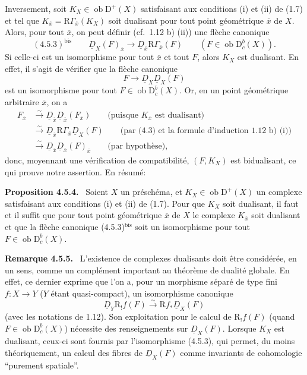 \documentclass[11pt]{article}
\newenvironment{statement}[1]{\par\medskip\noindent\textbf{#1.}\ }{\par\medskip}
\newcommand{\R}{\mathrm{R}}
\newcommand{\D}{\mathrm{D}}
\newcommand{\ob}{\operatorname{ob}}
\newcommand{\ol}[1]{\overline{#1}}
\begin{document}
Inversement, soit $K_X\in\ob\D^+(X)$ satisfaisant aux conditions (i) et (ii) de (1.7) et tel que $K_{\ol{x}}=\R\Gamma_{\ol{x}}(K_X)$ soit dualisant pour tout point géométrique $\ol{x}$ de $X$. Alors, pour tout $\ol{x}$, on peut définir (cf.~1.12 b) (ii)) une flèche canonique
\[
(4.5.3)^{\mathrm{bis}}\qquad \underline{D}_X(F)_{\ol{x}}\longrightarrow \underline{D}_{\ol{x}}\R\Gamma_{\ol{x}}(F)\qquad (F\in\ob\D_c^b(X)).
\]
Si celle-ci est un isomorphisme pour tout $\ol{x}$ et tout $F$, alors $K_X$ est dualisant. En effet, il s'agit de vérifier que la flèche canonique
\[
F\longrightarrow \underline{D}_X\underline{D}_X(F)
\]
est un isomorphisme pour tout $F\in\ob\D_c^b(X)$. Or, en un point géométrique arbitraire $\ol{x}$, on a
\[
\begin{aligned}
F_{\ol{x}}&\xrightarrow{\sim}\underline{D}_{\ol{x}}\underline{D}_{\ol{x}}(F_{\ol{x}})\qquad\text{(puisque $K_{\ol{x}}$ est dualisant)}\\
&\xrightarrow{\sim}\underline{D}_{\ol{x}}\R\Gamma_{\ol{x}}\underline{D}_X(F)\qquad\text{(par (4.3) et la formule d'induction 1.12 b) (i))}\\
&\xrightarrow{\sim}\underline{D}_{\ol{x}}\underline{D}_{\ol{x}}(F)_{\ol{x}}\qquad\text{(par hypothèse)},
\end{aligned}
\]
donc, moyennant une vérification de compatibilité, $(F,K_X)$ est bidualisant, ce qui prouve notre assertion. En résumé:

\begin{statement}{Proposition 4.5.4}
Soient $X$ un préschéma, et $K_X\in\ob\D^+(X)$ un complexe satisfaisant aux conditions (i) et (ii) de (1.7). Pour que $K_X$ soit dualisant, il faut et il suffit que pour tout point géométrique $\ol{x}$ de $X$ le complexe $K_{\ol{x}}$ soit dualisant et que la flèche canonique (4.5.3)$^{\mathrm{bis}}$ soit un isomorphisme pour tout $F\in\ob\D_c^b(X)$.
\end{statement}

\begin{statement}{Remarque 4.5.5}
L'existence de complexes dualisants doit être considérée, en un sens, comme un complément important au théorème de dualité globale. En effet, ce dernier exprime que l'on a, pour un morphisme séparé de type fini $f:X\to Y$ ($Y$ étant quasi-compact), un isomorphisme canonique
\[
\underline{D}_Y\R_!f(F)\xrightarrow{\sim}\R f_*\underline{D}_X(F)
\]
(avec les notations de 1.12). Son exploitation pour le calcul de $\R_!f(F)$ (quand $F\in\ob\D_c^b(X)$) nécessite des renseignements sur $\underline{D}_X(F)$. Lorsque $K_X$ est dualisant, ceux-ci sont fournis par l'isomorphisme (4.5.3), qui permet, du moins théoriquement, un calcul des fibres de $\underline{D}_X(F)$ comme invariants de cohomologie ``purement spatiale''.
\end{statement}
\end{document}
